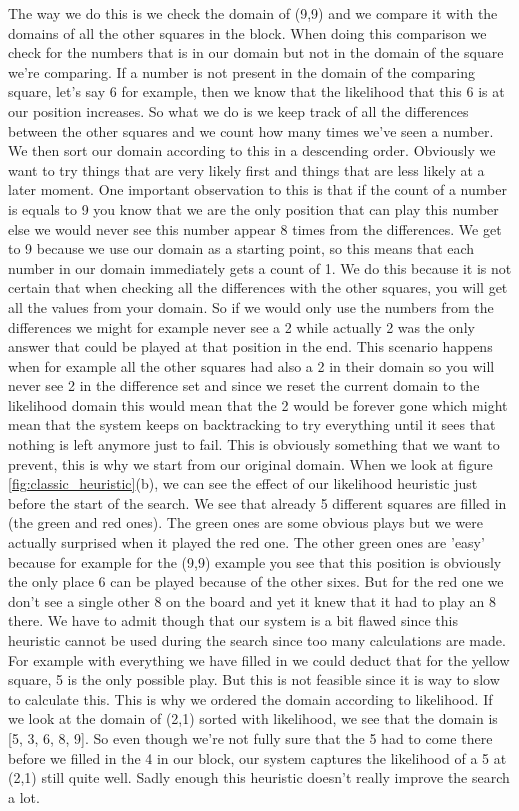 \documentclass{report}
\begin{document}
The way we do this is we check the domain of (9,9) and we compare it with the domains of all the other squares in the block. When doing this comparison we check for the numbers that is in our domain but not in the domain of the square we're comparing. If a number is not present in the domain of the comparing square, let's say 6 for example, then we know that the likelihood that this 6 is at our position increases. So what we do is we keep track of all the differences between the other squares and we count how many times we've seen a number. We then sort our domain according to this in a descending order. Obviously we want to try things that are very likely first and things that are less likely at a later moment. One important observation to this is that if the count of a number is equals to 9 you know that we are the only position that can play this number else we would never see this number appear 8 times from the differences. We get to 9 because we use our domain as a starting point, so this means that each number in our domain immediately gets a count of 1. We do this because it is not certain that when checking all the differences with the other squares, you will get all the values from your domain. So if we would only use the numbers from the differences we might for example never see a 2 while actually 2 was the only answer that could be played at that position in the end. 
\newline
\newline
This scenario happens when for example all the other squares had also a 2 in their domain so you will never see 2 in the difference set and since we reset the current domain to the likelihood domain this would mean that the 2 would be forever gone which might mean that the system keeps on backtracking to try everything until it sees that nothing is left anymore just to fail. This is obviously something that we want to prevent, this is why we start from our original domain. When we look at figure \ref{fig:classic_heuristic}(b), we can see the effect of our likelihood heuristic just before the start of the search. We see that already 5 different squares are filled in (the green and red ones). The green ones are some obvious plays but we were actually surprised when it played the red one. The other green ones are 'easy' because for example for the (9,9) example you see that this position is obviously the only place 6 can be played because of the other sixes. But for the red one we don't see a single other 8 on the board and yet it knew that it had to play an 8 there. We have to admit though that our system is a bit flawed since this heuristic cannot be used during the search since too many calculations are made. For example with everything we have filled in we could deduct that for the yellow square, 5 is the only possible play. But this is not feasible since it is way to slow to calculate this. This is why we ordered the domain according to likelihood. If we look at the domain of (2,1) sorted with likelihood, we see that the domain is [5, 3, 6, 8, 9]. So even though we're not fully sure that the 5 had to come there before we filled in the 4 in our block, our system captures the likelihood of a 5 at (2,1) still quite well. Sadly enough this heuristic doesn't really improve the search a lot.
\end{document}
